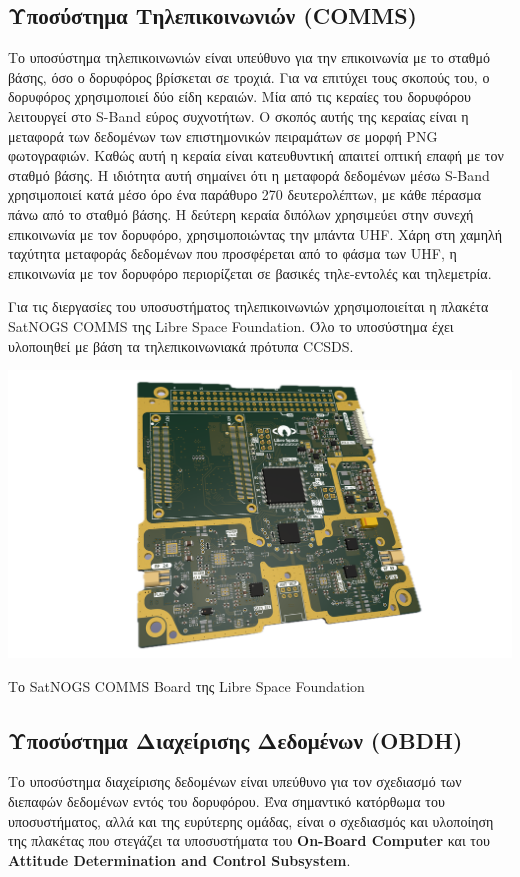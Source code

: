 \documentclass[a4paper,nobib,justified]{tufte-book}
\begin{document}
\subsection{Υποσύστημα Τηλεπικοινωνιών (\acs{COMMS})}
Το υποσύστημα τηλεπικοινωνιών είναι υπεύθυνο για την επικοινωνία με το σταθμό βάσης, όσο ο δορυφόρος βρίσκεται σε τροχιά. Για να επιτύχει τους σκοπούς του, ο δορυφόρος χρησιμοποιεί δύο είδη κεραιών. Μία από τις κεραίες του δορυφόρου λειτουργεί στο S-Band εύρος συχνοτήτων. Ο σκοπός αυτής της κεραίας είναι η μεταφορά των δεδομένων των επιστημονικών πειραμάτων σε μορφή PNG φωτογραφιών. Καθώς αυτή η κεραία είναι κατευθυντική απαιτεί οπτική επαφή με τον σταθμό βάσης. Η ιδιότητα αυτή σημαίνει ότι η μεταφορά δεδομένων μέσω S-Band χρησιμοποιεί κατά μέσο όρο ένα παράθυρο 270 δευτερολέπτων, με κάθε πέρασμα πάνω από το σταθμό βάσης. Η δεύτερη κεραία διπόλων χρησιμεύει στην συνεχή επικοινωνία με τον δορυφόρο, χρησιμοποιώντας την μπάντα UHF. Χάρη στη χαμηλή ταχύτητα μεταφοράς δεδομένων που προσφέρεται από το φάσμα των UHF, η επικοινωνία με τον δορυφόρο περιορίζεται σε βασικές τηλε-εντολές και τηλεμετρία. 

Για τις διεργασίες του υποσυστήματος τηλεπικοινωνιών χρησιμοποιείται η πλακέτα SatNOGS COMMS της Libre Space Foundation. Όλο το υποσύστημα έχει υλοποιηθεί με βάση τα τηλεπικοινωνιακά πρότυπα CCSDS.

\begin{marginfigure}
	\includegraphics{media/images/satnogs-comms.png}
	\caption{Το SatNOGS COMMS Board της Libre Space Foundation}
	\label{fig:satnogs-comms}
\end{marginfigure}

\subsection{Υποσύστημα Διαχείρισης Δεδομένων (\acs{OBDH})}
Το υποσύστημα διαχείρισης δεδομένων είναι υπεύθυνο για τον σχεδιασμό των διεπαφών δεδομένων εντός του δορυφόρου. Ένα σημαντικό κατόρθωμα του υποσυστήματος, αλλά και της ευρύτερης ομάδας, είναι ο σχεδιασμός και υλοποίηση της πλακέτας που στεγάζει τα υποσυστήματα του \textbf{On-Board Computer} και του \textbf{Attitude Determination and Control Subsystem}.
\end{document}
